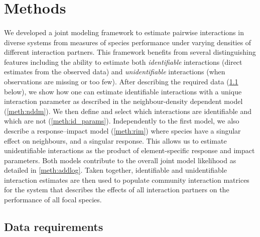 \documentclass[a4,12pt]{article}
\begin{document}
\section{Methods}

\paragraph{} 
We developed a joint modeling framework to estimate pairwise interactions in diverse systems from measures of species performance under varying densities of different interaction partners. This framework benefits from several distinguishing features including the ability to estimate both \textit{identifiable} interactions (direct estimates from the observed data) and \textit{unidentifiable} interactions (when observations are missing or too few). After describing the required data (\ref{meth:data} below), we show how one can estimate identifiable interactions with a unique interaction parameter as described in the neighbour-density dependent model (\ref{meth:nddm}).
We then define and select which interactions are identifiable and which are not (\ref{meth:id_params}). Independently to the first model, we also describe a response--impact model (\ref{meth:rim}) where species have a singular effect on neighbours, and a singular response. This allows us to estimate unidentifiable interactions as the product of element-specific response and impact parameters. Both models contribute to the overall joint model likelihood as detailed in \ref{meth:addlog}.
Taken together, identifiable and unidentifiable interaction estimates are then used to populate community interaction matrices for the system that describes the effects of all interaction partners on the performance of all focal species. 




    \subsection{Data requirements}
    \label{meth:data}
\end{document}
